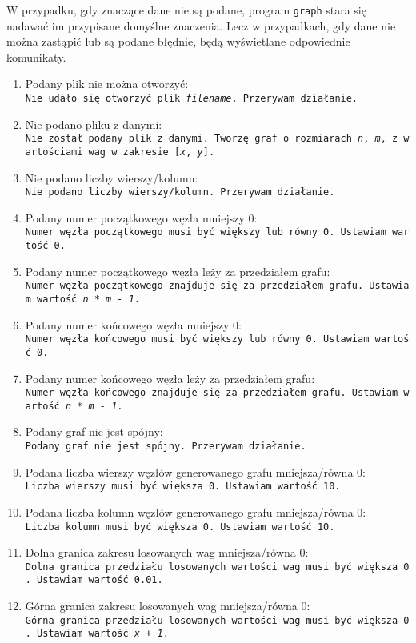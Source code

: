 \documentclass[]{article}
\begin{document}
W przypadku, gdy znaczące dane nie są podane, program \texttt{graph} stara się nadawać im przypisane domyślne znaczenia. Lecz w przypadkach, gdy dane nie można zastąpić lub są podane błędnie, będą wyświetlane odpowiednie komunikaty.

\begin{enumerate}
\def\labelenumi{\arabic{enumi}.}
\item
  Podany plik nie można otworzyć:
  \texttt{Nie\ udało\ się\ otworzyć\ plik\ \emph{filename}.\ Przerywam\ działanie.}
\item
  Nie podano pliku z danymi:
  \texttt{Nie\ został\ podany\ plik\ z\ danymi.\ Tworzę\ graf\ o\ rozmiarach\ \emph{n},\ \emph{m},\ z\ wartościami\ wag\ w\ zakresie\ [\emph{x},\ \emph{y}].}
\item
  Nie podano liczby wierszy/kolumn:
  \texttt{Nie\ podano\ liczby\ wierszy\texttt{/}kolumn.\ Przerywam\ działanie. }
\item
  Podany numer początkowego węzła mniejszy 0:
  \texttt{Numer\ węzła\ początkowego\ musi\ być\ większy\ lub\ równy\ 0.\ Ustawiam\ wartość\ 0.}
\item
  Podany numer początkowego węzła leży za przedziałem grafu:
  \texttt{Numer\ węzła\ początkowego\ znajduje\ się\ za\ przedziałem\ grafu.\ Ustawiam\ wartość\ \emph{n * m - 1}.}
\item
  Podany numer końcowego węzła mniejszy 0:
  \texttt{Numer\ węzła\ końcowego\ musi\ być\ większy\ lub\ równy\ 0.\ Ustawiam\ wartość\ 0.}
\item
  Podany numer końcowego węzła leży za przedziałem grafu:
  \texttt{Numer\ węzła\ końcowego\ znajduje\ się\ za\ przedziałem\ grafu.\ Ustawiam\ wartość\ \emph{n * m - 1}.}
\item
  Podany graf nie jest spójny:
  \texttt{Podany\ graf\ nie\ jest\ spójny.\ Przerywam\ działanie.}
\item
  Podana liczba wierszy węzłów generowanego grafu mniejsza/równa 0:
  \texttt{Liczba\ wierszy\ musi\ być\ większa\ 0.\ Ustawiam\ wartość\ 10.}
\item
  Podana liczba kolumn węzłów generowanego grafu mniejsza/równa 0:
  \texttt{Liczba\ kolumn\ musi\ być\ większa\ 0.\ Ustawiam\ wartość\ 10.}
\item
  Dolna granica zakresu losowanych wag mniejsza/równa 0:
  \texttt{Dolna\ granica\ przedziału\ losowanych\ wartości\ wag\ musi\ być\ większa\ 0.\ Ustawiam\ wartość\ 0.01.}
\item
  Górna granica zakresu losowanych wag mniejsza/równa 0:
  \texttt{Górna\ granica\ przedziału\ losowanych\ wartości\ wag\ musi\ być\ większa\ 0.\ Ustawiam\ wartość\ \emph{x + 1}.}
\end{enumerate}
\end{document}
